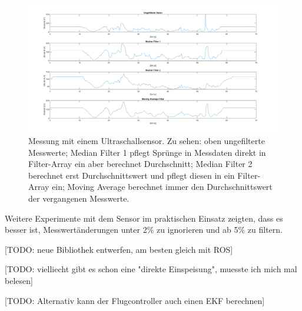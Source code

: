 \begin{figure}[!h]
	\includegraphics[width=\linewidth]{images/ultrasonic_cmp_filter.png}
	\caption{Messung mit einem Ultraschallsensor. Zu sehen: oben ungefilterte Messwerte; Median Filter 1 pflegt Sprünge in Messdaten direkt in Filter-Array ein aber berechnet Durchschnitt; Median Filter 2 berechnet erst Durchschnittswert und pflegt diesen in ein Filter-Array ein; Moving Average berechnet immer den Durchschnittswert der vergangenen Messwerte.}
	\label{fig:ultrasonic_filters}
  \end{figure}

Weitere Experimente mit dem Sensor im praktischen Einsatz zeigten, dass es besser ist, Messwertänderungen unter 2\% zu ignorieren und ab 5\% zu filtern. 

[TODO: neue Bibliothek entwerfen, am besten gleich mit ROS]


[TODO: vielliecht gibt es schon eine "direkte Einspeisung", muesste ich mich mal belesen]

[TODO: Alternativ kann der Flugcontroller auch einen EKF berechnen]
